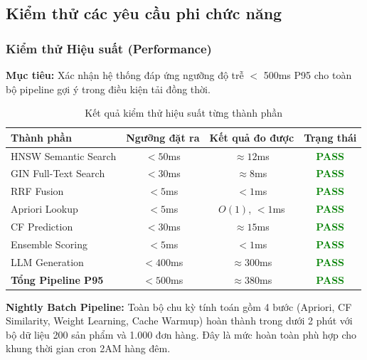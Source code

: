 \documentclass[12pt,a4paper]{report}
\begin{document}
\subsection{Kiểm thử các yêu cầu phi chức năng}

\subsubsection{Kiểm thử Hiệu suất (Performance)}

\textbf{Mục tiêu:} Xác nhận hệ thống đáp ứng ngưỡng độ trễ $<$ 500ms P95 cho toàn bộ pipeline gợi ý trong điều kiện tải đồng thời.

\begin{table}[htbp]
\centering
\renewcommand{\arraystretch}{1.3}
\begin{tabular}{|l|c|c|c|}
\hline
\rowcolor[HTML]{EFEFEF}
\textbf{Thành phần} & \textbf{Ngưỡng đặt ra} & \textbf{Kết quả đo được} & \textbf{Trạng thái} \\ \hline
HNSW Semantic Search & $< 50$ms & $\approx 12$ms & \textcolor{green}{\textbf{PASS}} \\ \hline
GIN Full-Text Search & $< 30$ms & $\approx 8$ms & \textcolor{green}{\textbf{PASS}} \\ \hline
RRF Fusion & $< 5$ms & $< 1$ms & \textcolor{green}{\textbf{PASS}} \\ \hline
Apriori Lookup & $< 5$ms & $O(1)$, $< 1$ms & \textcolor{green}{\textbf{PASS}} \\ \hline
CF Prediction & $< 30$ms & $\approx 15$ms & \textcolor{green}{\textbf{PASS}} \\ \hline
Ensemble Scoring & $< 5$ms & $< 1$ms & \textcolor{green}{\textbf{PASS}} \\ \hline
LLM Generation & $< 400$ms & $\approx 300$ms & \textcolor{green}{\textbf{PASS}} \\ \hline
\rowcolor[HTML]{D1FAE5}
\textbf{Tổng Pipeline P95} & $< 500$ms & $\approx 380$ms & \textcolor{green}{\textbf{PASS}} \\ \hline
\end{tabular}
\caption{Kết quả kiểm thử hiệu suất từng thành phần}
\end{table}

\textbf{Nightly Batch Pipeline:} Toàn bộ chu kỳ tính toán gồm 4 bước (Apriori, CF Similarity, Weight Learning, Cache Warmup) hoàn thành trong dưới 2 phút với bộ dữ liệu 200 sản phẩm và 1.000 đơn hàng. Đây là mức hoàn toàn phù hợp cho khung thời gian cron 2AM hàng đêm.
\end{document}
